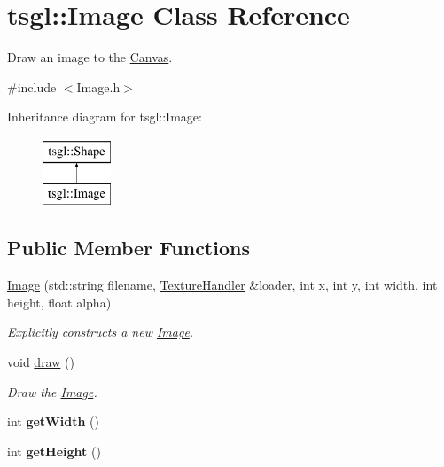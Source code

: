 \hypertarget{classtsgl_1_1_image}{}\section{tsgl\+:\+:Image Class Reference}
\label{classtsgl_1_1_image}


Draw an image to the \hyperlink{classtsgl_1_1_canvas}{Canvas}.  




{\ttfamily \#include $<$Image.\+h$>$}

Inheritance diagram for tsgl\+:\+:Image\+:\begin{figure}[H]
\begin{center}
\leavevmode
\includegraphics[height=2.000000cm]{classtsgl_1_1_image}
\end{center}
\end{figure}
\subsection*{Public Member Functions}
\begin{DoxyCompactItemize}
\item 
\hyperlink{classtsgl_1_1_image_a497894a4dbfa46d1e3aefd7dbe086cc3}{Image} (std\+::string filename, \hyperlink{classtsgl_1_1_texture_handler}{Texture\+Handler} \&loader, int x, int y, int width, int height, float alpha)
\begin{DoxyCompactList}\small\item\em Explicitly constructs a new \hyperlink{classtsgl_1_1_image}{Image}. \end{DoxyCompactList}\item 
void \hyperlink{classtsgl_1_1_image_a85732de312b98dd5ce5a9cc319bbf8c5}{draw} ()
\begin{DoxyCompactList}\small\item\em Draw the \hyperlink{classtsgl_1_1_image}{Image}. \end{DoxyCompactList}\item 
\hypertarget{classtsgl_1_1_image_af01d5f815b91f20fd441f9bcec671d79}{}int {\bfseries get\+Width} ()\label{classtsgl_1_1_image_af01d5f815b91f20fd441f9bcec671d79}

\item 
\hypertarget{classtsgl_1_1_image_afa939262dcf32c9a504efe30a8de5c58}{}int {\bfseries get\+Height} ()\label{classtsgl_1_1_image_afa939262dcf32c9a504efe30a8de5c58}

\end{DoxyCompactItemize}
